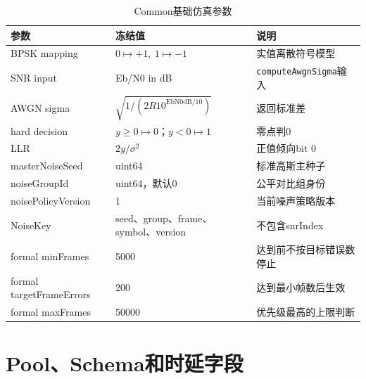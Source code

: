 \begin{table}[htbp]
  \centering
  \small
  \caption{Common基础仿真参数}
  \label{tab:app-common-simulation}
  \begin{tabular}{p{}p{}p{}}
    \toprule
    参数 & 冻结值 & 说明 \\
    \midrule
    BPSK mapping & $0\mapsto+1,\ 1\mapsto-1$ & 实值离散符号模型 \\
    SNR input & Eb/N0 in dB & \texttt{computeAwgnSigma}输入 \\
    AWGN sigma & $\sqrt{1/(2R10^{\mathrm{EbN0dB}/10})}$ & 返回标准差 \\
    hard decision & $y\ge0\mapsto0$；$y<0\mapsto1$ & 零点判0 \\
    LLR & $2y/\sigma^2$ & 正值倾向bit 0 \\
    masterNoiseSeed & uint64 & 标准高斯主种子 \\
    noiseGroupId & uint64，默认0 & 公平对比组身份 \\
    noisePolicyVersion & 1 & 当前噪声策略版本 \\
    NoiseKey & seed、group、frame、symbol、version & 不包含snrIndex \\
    formal minFrames & 5000 & 达到前不按目标错误数停止 \\
    formal targetFrameErrors & 200 & 达到最小帧数后生效 \\
    formal maxFrames & 50000 & 优先级最高的上限判断 \\
    \bottomrule
  \end{tabular}
\end{table}

\section{Pool、Schema和时延字段}

